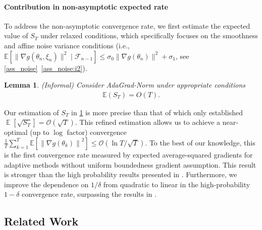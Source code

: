 \documentclass[standalone]{article}
\newcommand{\E}{\mathbb{E}}
\newtheorem{lem}{Lemma}[section]
\DeclareMathOperator{\Expect}{\mathbb{E}}
\begin{document}
\paragraph{\textbf{Contribution in non-asymptotic expected rate}} To address the non-asymptotic convergence rate, we first estimate the expected value of $S_T$ under relaxed conditions, which specifically focuses on the smoothness and affine noise variance conditions (i.e., $\E[\big\|\nabla g(\theta_n,\xi_{n})\big\|^{2} \mid \mathscr{F}_{n-1}]\le \sigma_{0}\big\|\nabla g(\theta_n)\big\|^{2}+\sigma_{1}$, see \cref{ass_noise}~\ref{ass_noise:i2}). %
\begin{lem}\label{lem:st:informal}(Informal) Consider AdaGrad-Norm under appropriate conditions
\begin{align*}
\E(S_{T})=O(T).
\end{align*}
\end{lem}
Our estimation of $S_T$ in \cref{lem:st:informal} is more precise than that of \cite{wang2023convergence} which only established $\Expect[\sqrt{S_{T}}] = \mathcal{O}(\sqrt{T})$. This refined estimation allows us to achieve a near-optimal (up to $\log$ factor) convergence  $\frac{1}{T}\sum_{k=1}^{T}\E[\left\|\nabla g(\theta_k) \right\|^2] \leq \mathcal{O}(\ln T /\sqrt{T})$. %
To the best of our knowledge, this is the first convergence rate measured by expected average-squared gradients for adaptive methods without uniform boundedness gradient assumption. This result is stronger than the high probability results presented in \cite{faw2022power,wang2023convergence}. Furthermore, we improve the dependence on $1/\delta$ from quadratic to linear in the high-probability $1-\delta$ convergence rate, surpassing the results in \cite{faw2022power,wang2023convergence}.




\subsection{Related Work}
\end{document}
